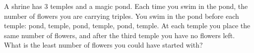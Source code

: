A shrine has $3$ temples and a magic pond. Each time you swim in the pond, the number of flowers you are carrying triples. You swim in the pond before each temple: pond, temple, pond, temple, pond, temple. At each temple you place the same number of flowers, and after the third temple you have no flowers left. What is the least number of flowers you could have started with?

